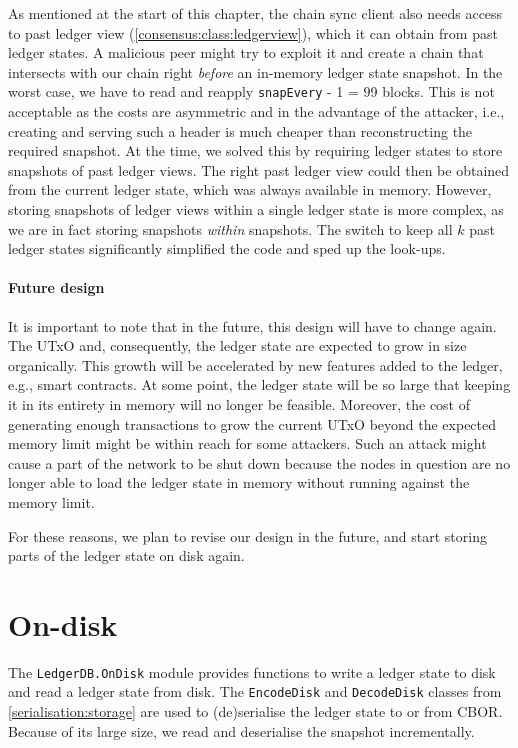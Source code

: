 As mentioned at the start of this chapter, the chain sync client also needs
access to past ledger view (\cref{consensus:class:ledgerview}), which it can
obtain from past ledger states. A malicious peer might try to exploit it and
create a chain that intersects with our chain right \emph{before} an in-memory
ledger state snapshot. In the worst case, we have to read and reapply
\lstinline!snapEvery! - 1 = 99 blocks. This is not acceptable as the costs are
asymmetric and in the advantage of the attacker, i.e., creating and serving such
a header is much cheaper than reconstructing the required snapshot. At the time,
we solved this by requiring ledger states to store snapshots of past ledger
views. The right past ledger view could then be obtained from the current ledger
state, which was always available in memory. However, storing snapshots of
ledger views within a single ledger state is more complex, as we are in fact
storing snapshots \emph{within} snapshots. The switch to keep all $k$ past
ledger states significantly simplified the code and sped up the look-ups.

\paragraph{Future design}

It is important to note that in the future, this design will have to change
again. The UTxO and, consequently, the ledger state are expected to grow in size
organically. This growth will be accelerated by new features added to the
ledger, e.g., smart contracts. At some point, the ledger state will be so large
that keeping it in its entirety in memory will no longer be feasible. Moreover,
the cost of generating enough transactions to grow the current UTxO beyond the
expected memory limit might be within reach for some attackers. Such an attack
might cause a part of the network to be shut down because the nodes in question
are no longer able to load the ledger state in memory without running against
the memory limit.

For these reasons, we plan to revise our design in the future, and start storing
parts of the ledger state on disk again.

\section{On-disk}
\label{ledgerdb:on-disk}

The \lstinline!LedgerDB.OnDisk! module provides functions to write a ledger
state to disk and read a ledger state from disk. The \lstinline!EncodeDisk! and
\lstinline!DecodeDisk! classes from \cref{serialisation:storage} are used to
(de)serialise the ledger state to or from CBOR. Because of its large size, we
read and deserialise the snapshot incrementally.

